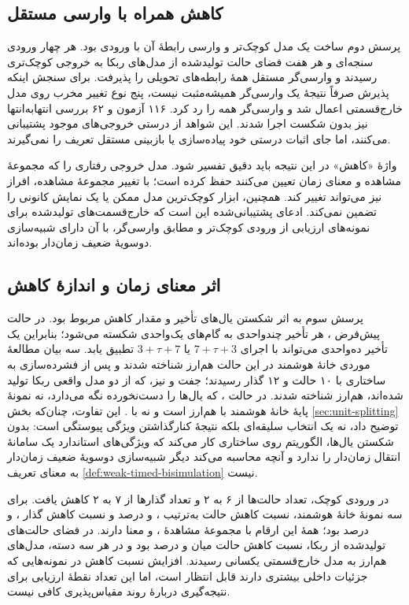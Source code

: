 \subsection{کاهش همراه با وارسی مستقل}

پرسش دوم ساخت یک مدل کوچک‌تر و وارسی رابطهٔ آن با ورودی بود. هر چهار ورودی سنجه‌ای و هر هفت فضای حالت تولیدشده از مدل‌های ربکا به خروجی کوچک‌تری رسیدند و وارسی‌گر مستقل همهٔ رابطه‌های تحویلی را پذیرفت. برای سنجش اینکه پذیرش صرفاً نتیجهٔ یک وارسی‌گر همیشه‌مثبت نیست، پنج نوع تغییر مخرب روی مدل خارج‌قسمتی اعمال شد و وارسی‌گر همه را رد کرد. ۱۱۶ آزمون  و ۶۲ بررسی انتهابه‌انتها نیز بدون شکست اجرا شدند. این شواهد از درستی خروجی‌های موجود پشتیبانی می‌کنند، اما جای اثبات درستی خود پیاده‌سازی یا بازبینی مستقل تعریف را نمی‌گیرند.

واژهٔ «کاهش» در این نتیجه باید دقیق تفسیر شود. مدل خروجی رفتاری را که مجموعهٔ مشاهده و معنای زمان تعیین می‌کنند حفظ کرده است؛ با تغییر مجموعهٔ مشاهده، افراز نیز می‌تواند تغییر کند. همچنین، ابزار کوچک‌ترین مدل ممکن یا یک نمایش کانونی را تضمین نمی‌کند. ادعای پشتیبانی‌شده این است که خارج‌قسمت‌های تولیدشده برای نمونه‌های ارزیابی از ورودی کوچک‌تر و مطابق وارسی‌گر، با آن دارای شبیه‌سازی دوسویهٔ ضعیف زمان‌دار بوده‌اند.

\subsection{اثر معنای زمان و اندازهٔ کاهش}

پرسش سوم به اثر شکستن یال‌های تأخیر و مقدار کاهش مربوط بود. در حالت پیش‌فرض ، هر تأخیر چندواحدی به گام‌های یک‌واحدی شکسته می‌شود؛ بنابراین یک تأخیر ده‌واحدی می‌تواند با اجرای $7+\tau+3$ یا $3+\tau+7$ تطبیق یابد. سه بیان مطالعهٔ موردی خانهٔ هوشمند در این حالت هم‌ارز شناخته شدند و پس از فشرده‌سازی به ساختاری با ۱۰ حالت و ۱۲ گذار رسیدند؛ جفت  و  نیز، که از دو مدل واقعی ربکا تولید شده‌اند، هم‌ارز شناخته شدند. در حالت ، که یال‌ها را دست‌نخورده نگه می‌دارد، نه نمونهٔ پایهٔ خانهٔ هوشمند با  هم‌ارز است و نه  با . این تفاوت، چنان‌که بخش \ref{sec:unit-splitting} توضیح داد، نه یک انتخاب سلیقه‌ای بلکه نتیجهٔ کنارگذاشتن ویژگی پیوستگی است: بدون شکستن یال‌ها، الگوریتم روی ساختاری کار می‌کند که ویژگی‌های استاندارد یک سامانهٔ انتقال زمان‌دار را ندارد و آنچه محاسبه می‌کند دیگر شبیه‌سازی دوسویهٔ ضعیف زمان‌دار به معنای تعریف \ref{def:weak-timed-bisimulation} نیست.

در ورودی کوچک، تعداد حالت‌ها از ۶ به ۲ و تعداد گذارها از ۷ به ۲ کاهش یافت. برای سه نمونهٔ خانهٔ هوشمند، نسبت کاهش حالت به‌ترتیب ،  و  درصد و نسبت کاهش گذار ،  و  درصد بود؛ همهٔ این ارقام با مجموعهٔ مشاهدهٔ ،  و  معنا دارند. در فضای حالت‌های تولیدشده از ربکا، نسبت کاهش حالت میان  و  درصد بود و در هر سه دسته، مدل‌های هم‌ارز به مدل خارج‌قسمتی یکسانی رسیدند. افزایش نسبت کاهش در نمونه‌هایی که جزئیات داخلی بیشتری دارند قابل انتظار است، اما این تعداد نقطهٔ ارزیابی برای نتیجه‌گیری دربارهٔ روند مقیاس‌پذیری کافی نیست.

